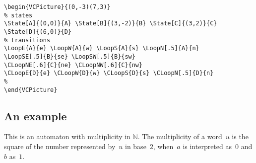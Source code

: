\documentclass[11pt,twoside]{article}
\newlength{\parindenttemp} %
\newcommand{\noi}{\noindent}
\newlength{\jsIndent}%
\newlength{\ColSource}%
\newlength{\ColFigur}%
\begin{document}
\noi 
\hspace*{-\jsIndent}
\begin{minipage}[t]{\ColFigur}%
\par\vspace*{0mm}%
\bigskip 
\begin{center}
%
\end{center}
\end{minipage}%
\hspace*{1.2em}%
\begin{minipage}[t]{\ColSource}
\setlength{\parindent}{\parindenttemp}%
\par\vspace*{0mm}%
\footnotesize
\begin{verbatim}
\begin{VCPicture}{(0,-3)(7,3)}
% states
\State[A]{(0,0)}{A} \State[B]{(3,-2)}{B} \State[C]{(3,2)}{C}
\State[D]{(6,0)}{D}
% transitions 
\LoopE{A}{e} \LoopW{A}{w} \LoopS{A}{s} \LoopN[.5]{A}{n} 
\LoopSE[.5]{B}{se} \LoopSW[.5]{B}{sw} 
\CLoopNE[.6]{C}{ne} \CLoopNW[.6]{C}{nw} 
\CLoopE{D}{e} \CLoopW{D}{w} \CLoopS{D}{s} \CLoopN[.5]{D}{n} 
%
\end{VCPicture}
\end{verbatim}
\normalsize
\end{minipage}%



\subsection{An example}\label{subsec.ex1}
This is an automaton with multiplicity in $\mathbb{N}$.
The multiplicity of a word~$u$ is the square of the number represented by~$u$
in base~$2$, when~$a$ is interpreted as~$0$ and $b$ as~$1$.
\end{document}
